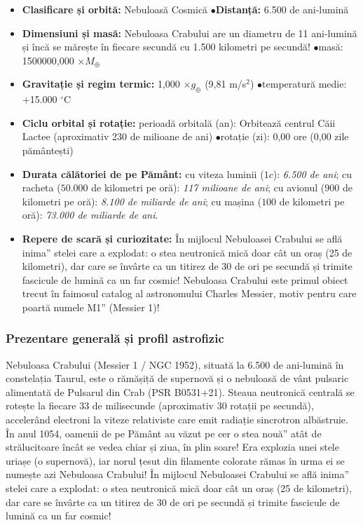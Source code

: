 \begin{tcolorbox}[orbitardata, title={\textbf{Repere esențiale: Nebuloasa Crabului (M1)}}]
\small
\begin{itemize}[leftmargin=1.4em, itemsep=2pt, topsep=2pt]
  \item \textbf{Clasificare și orbită:} Nebuloasă Cosmică \quad$\bullet$\quad \textbf{Distanță:} 6.500 de ani-lumină
  \item \textbf{Dimensiuni și masă:} Nebuloasa Crabului are un diametru de 11 ani-lumină și încă se mărește în fiecare secundă cu 1.500 kilometri pe secundă! \quad$\bullet$\quad masă: 1500000,000 $\times M_\oplus$
  \item \textbf{Gravitație și regim termic:} 1,000 $\times g_\oplus$ (9,81 m/s$^2$) \quad$\bullet$\quad temperatură medie: +15.000 $^\circ$C
  \item \textbf{Ciclu orbital și rotație:} perioadă orbitală (an): Orbitează centrul Căii Lactee (aproximativ 230 de milioane de ani) \quad$\bullet$\quad rotație (zi): 0,00 ore (0,00 zile pământești)
  \item \textbf{Durata călătoriei de pe Pământ:} cu viteza luminii ($1c$): \emph{6.500 de ani}; cu racheta ($50.000$ de kilometri pe oră): \emph{117 milioane de ani}; cu avionul ($900$ de kilometri pe oră): \emph{8.100 de miliarde de ani}; cu mașina ($100$ de kilometri pe oră): \emph{73.000 de miliarde de ani}.
  \item \textbf{Repere de scară și curiozitate:} În mijlocul Nebuloasei Crabului se află \quotedblbase{}inima\textquotedblright{} stelei care a explodat: o stea neutronică mică doar cât un oraș (25 de kilometri), dar care se învârte ca un titirez de 30 de ori pe secundă și trimite fascicule de lumină ca un far cosmic! Nebuloasa Crabului este primul obiect trecut în faimosul catalog al astronomului Charles Messier, motiv pentru care poartă numele \quotedblbase{}M1\textquotedblright{} (Messier 1)!
\end{itemize}
\end{tcolorbox}

\subsubsection*{Prezentare generală și profil astrofizic}
Nebuloasa Crabului (Messier 1 / NGC 1952), situată la 6.500 de ani-lumină în constelația Taurul, este o rămășiță de supernovă și o nebuloasă de vânt pulsaric alimentată de Pulsarul din Crab (PSR B0531+21). Steaua neutronică centrală se rotește la fiecare 33 de milisecunde (aproximativ 30 rotații pe secundă), accelerând electroni la viteze relativiste care emit radiație sincrotron albăstruie. În anul 1054, oamenii de pe Pământ au văzut pe cer o \quotedblbase{}stea nouă\textquotedblright{} atât de strălucitoare încât se vedea chiar și ziua, în plin soare! Era explozia unei stele uriașe (o supernovă), iar norul țesut din filamente colorate rămas în urma ei se numește azi Nebuloasa Crabului! În mijlocul Nebuloasei Crabului se află \quotedblbase{}inima\textquotedblright{} stelei care a explodat: o stea neutronică mică doar cât un oraș (25 de kilometri), dar care se învârte ca un titirez de 30 de ori pe secundă și trimite fascicule de lumină ca un far cosmic!

